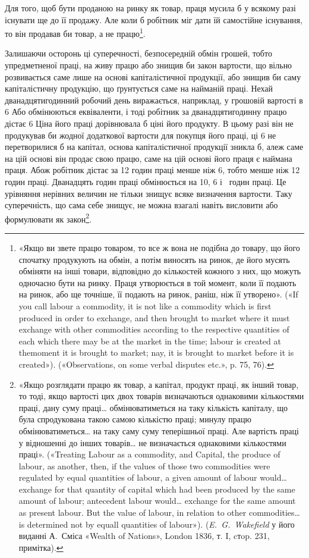 Для того, щоб бути проданою на ринку як товар, праця мусила
б у всякому разі існувати ще до її продажу. Але коли б
робітник міг дати їй самостійне існування, то він продавав би
товар, а не працю\footnote{
«Якщо ви звете працю товаром, то все ж вона не подібна до товару,
що його спочатку продукують на обмін, а потім виносять на ринок, де
його мусять обміняти на інші товари, відповідно до кількостей кожного
з них, що можуть одночасно бути на ринку. Праця утворюється в той
момент, коли її подають на ринок, або ще точніше, її подають на ринок,
раніш, ніж її утворено». («If you call labour a commodity, it is not like a
commodity which is first produced in order to exchange, and then brought
to market where it must exchange with other commodities according to the
respective quantities of each which there may be at the market in the
time; labour is created at themoment it is brought to market; nay, it is
brought to market before it is created»). («Observations, on some verbal
disputes etc.», p. 75, 76).
}.

Залишаючи осторонь ці суперечності, безпосередній обмін грошей,
тобто упредметненої праці, на живу працю або знищив би
закон вартости, що вільно розвивається саме лише на основі
капіталістичної продукції, або знищив би саму капіталістичну
продукцію, що ґрунтується саме на найманій праці. Нехай дванадцятигодинний
робочий день виражається, наприклад, у грошовій
вартості в 6 Або обмінюються еквіваленти, і тоді
робітник за дванадцятигодинну працю дістає 6 Ціна
його праці дорівнювала б ціні його продукту. В цьому разі він
не продукував би жодної додаткової вартости для покупця його
праці, ці 6 не перетворилися б на капітал, основа капіталістичної
продукції зникла б, алеж саме на цій основі він
продає свою працю, саме на цій основі його праця є наймана
праця. Абож робітник дістає за 12 годин праці менше ніж 6,
тобто менше ніж 12 годин праці. Дванадцять годин праці
обмінюється на 10, 6 і~ годин праці. Це урівняння нерівних
величин не тільки знищує всяке визначення вартости. Таку
суперечність, що сама себе знищує, не можна взагалі навіть висловити
або формулювати як закон\footnote{
«Якщо розглядати працю як товар, а капітал, продукт праці,
як інший товар, то тоді, якщо вартості цих двох товарів визначаються
однаковими кількостями праці, дану суму праці\dots{} обмінюватиметься
на таку кількість капіталу, що була спродукована такою самою кількістю
праці; минулу працю обмінюватиметься\dots{} на таку саму суму теперішньої
праці. Але вартість праці у відношенні до інших товарів\dots{} не визначається
однаковими кількостями праці». («Treating Labour as a commodity,
and Capital, the produce of labour, as another, then, if the values
of those two commodities were regulated by equal quantities of labour,
a given amount of labour would\dots{} exchange for that quantity of capital
which had been produced by the same amount of labour; antecedent labour
would\dots{} exchange for the same amount as present labour. But the value
of labour, in relation to other commodities\dots{} is determined not by equall
quantities of labour»). (\emph{E.~G.~Wakefield} у його виданні А.~Сміса «Wealth
of Nations», London 1836, т. I, cтop. 231, примітка).
}.
